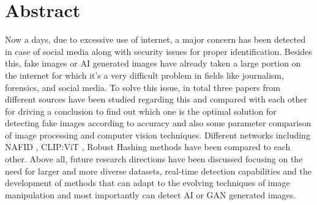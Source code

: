 \documentclass[a4paper,14pt]{report}
\begin{document}
\chapter*{Abstract}
Now a days, due to excessive use of internet, a major concern has been detected in case of social media along with security issues for proper identification. Besides this, fake images or AI generated images have already taken a large portion on the internet for which it's a very difficult problem in fields like journalism, forensics, and social media. To solve this issue, in total three papers from different sources have been studied regarding this and compared with each other for driving a conclusion to find out which one is the optimal solution for detecting fake images according to accuracy and also some parameter comparison of image processing and computer vision techniques. Different networks including NAFID \cite{1} , CLIP:ViT \cite{2} , Robust Hashing \cite{3}  methods have been compared to each other. Above all, future research directions have been discussed focusing on the need for larger and more diverse datasets, real-time detection capabilities and the development of methods that can adapt to the evolving techniques of image manipulation and most importantly can detect AI or GAN generated images.
\end{document}
